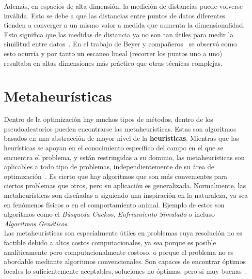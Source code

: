 Además, en espacios de alta dimensión, la medición de distancias puede volverse inválida. Esto se debe a que las distancias entre puntos de datos diferentes tienden a converger a un mismo valor a medida que aumenta la dimensionalidad. Esto significa que las medidas de distancia ya no son tan útiles para medir la similitud entre datos~\cite{peng_interpreting_2024, venkat2018curse}. En el trabajo de Beyer y compañeros~\cite{beyer99nn} se observó como esto ocurría y por tanto un escaneo lineal (recorrer los puntos uno a uno) resultaba en altas dimensiones más práctico que otras técnicas complejas.
\section{Metaheurísticas}
Dentro de la optimización hay muchos tipos de métodos, dentro de los pseudoaleatorios pueden encontrarse las metaheurísticas. Estas son algoritmos basados en una abstracción de mayor nivel de la \textbf{heurísticas}. Mientras que las heurísticas se apoyan en el conocimiento específico del campo en el que se encuentra el problema, y están restringidas a su dominio, las metaheurísticas son aplicables a todo tipo de problemas, independientemente de su área de optimización~\cite{bianchi2009survey}. Es cierto que hay algoritmos que son más convenientes para ciertos problemas que otros, pero su aplicación es generalizada. Normalmente, las metaheurísticas son diseñadas a siguiendo una inspiración en la naturaleza, ya sea en fenómenos físicos o en el comportamiento animal. Ejemplo de estos son algoritmos como el \textit{Búsqueda Cuckoo}, \textit{Enfriamiento Simulado} o incluso \textit{Algoritmos Genéticos}.\\[6pt]
Las metaheurísticas son especialmente útiles en problemas cuya resolución no es factible debido a altos costos computacionales, ya sea porque es posible analíticamente pero computacionalmente costoso, o porque el problema no es abordable mediante algoritmos convencionales. Son capaces de encontrar óptimos locales lo suficientemente aceptables, soluciones no óptimas, pero si muy buenas~\cite{bianchi2009survey}.

